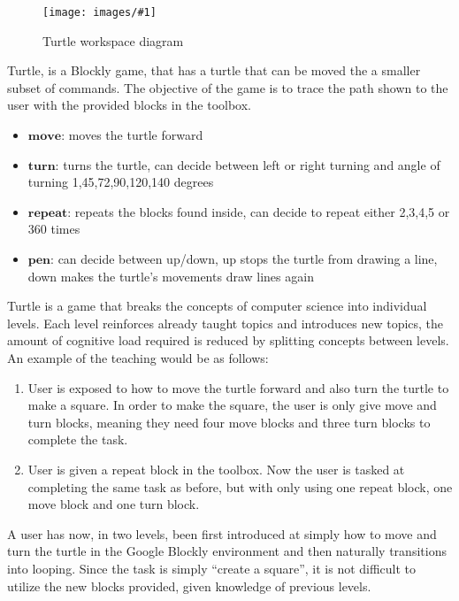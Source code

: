 \documentclass[]{article}
\newcommand\fig[3]{
\begin{figure}
  \begin{center}
  \texttt{[image: images/\#1]}
  \caption{#2} 
  \label{fig:#1}
  \end{center}
\end{figure}
}
\begin{document}
\fig{turtle_workspace.jpg}{Turtle workspace diagram}{width=4cm}

Turtle, is a Blockly game, that has a turtle that can be moved the a smaller
subset of commands. The objective of the game is to trace the path shown to the
user with the provided blocks in the toolbox.

\begin{itemize}
  \item $\textbf{move}$: moves the turtle forward
  \item $\textbf{turn}$: turns the turtle, can decide between left or right turning and angle of turning  1,45,72,90,120,140 degrees
  \item $\textbf{repeat}$: repeats the blocks found inside, can decide to repeat either 2,3,4,5 or 360 times
  \item $\textbf{pen}$: can decide between up/down, up stops the turtle from drawing a line, down makes the turtle's movements draw lines again
\end{itemize}
Turtle is a game that breaks the concepts of computer science into individual
levels. Each level reinforces already taught topics and introduces new topics, the amount of cognitive load
required is reduced by splitting concepts between levels. An example of the teaching would be as follows:
\begin{enumerate}
  \item User is exposed to how to move the turtle forward and also turn the turtle to make a square. In order to make the square, the user
    is only give move and turn blocks, meaning they need four move blocks and three turn blocks to complete the task.
  \item User is given a repeat block in the toolbox. Now the user is tasked at completing the same task as before, but with only using one repeat
    block, one move block and one turn block.
\end{enumerate}
A user has now, in two levels, been first introduced at simply how to move and turn the turtle in the Google Blockly environment and then
naturally transitions into looping. Since the task is simply ``create a square'', it is not difficult to utilize the new blocks provided,
given knowledge of previous levels.
\end{document}
